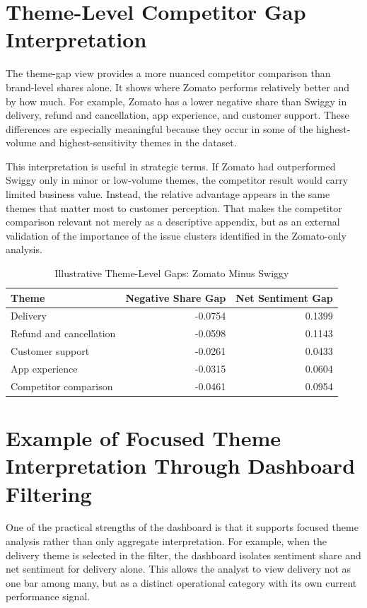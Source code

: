 \section{Theme-Level Competitor Gap Interpretation}

The theme-gap view provides a more nuanced competitor comparison than brand-level shares alone. It shows where Zomato performs relatively better and by how much. For example, Zomato has a lower negative share than Swiggy in delivery, refund and cancellation, app experience, and customer support. These differences are especially meaningful because they occur in some of the highest-volume and highest-sensitivity themes in the dataset.

This interpretation is useful in strategic terms. If Zomato had outperformed Swiggy only in minor or low-volume themes, the competitor result would carry limited business value. Instead, the relative advantage appears in the same themes that matter most to customer perception. That makes the competitor comparison relevant not merely as a descriptive appendix, but as an external validation of the importance of the issue clusters identified in the Zomato-only analysis.

\begin{table}[h]
\centering
\caption{Illustrative Theme-Level Gaps: Zomato Minus Swiggy}
\begin{tabular}{lrr}
\toprule
\textbf{Theme} & \textbf{Negative Share Gap} & \textbf{Net Sentiment Gap} \\
\midrule
Delivery & -0.0754 & 0.1399 \\
Refund and cancellation & -0.0598 & 0.1143 \\
Customer support & -0.0261 & 0.0433 \\
App experience & -0.0315 & 0.0604 \\
Competitor comparison & -0.0461 & 0.0954 \\
\bottomrule
\end{tabular}
\end{table}

\section{Example of Focused Theme Interpretation Through Dashboard Filtering}

One of the practical strengths of the dashboard is that it supports focused theme analysis rather than only aggregate interpretation. For example, when the delivery theme is selected in the filter, the dashboard isolates sentiment share and net sentiment for delivery alone. This allows the analyst to view delivery not as one bar among many, but as a distinct operational category with its own current performance signal.

